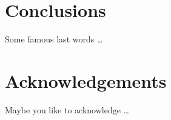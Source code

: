 \documentclass{egpubl}
\begin{document}
\section{Conclusions}
\label{sec:conclusion}
Some famous last words \ldots
\blindtext


\section{Acknowledgements}
\label{sec:acknowledgements}
Maybe you like to acknowledge \ldots 


%


\end{document}
